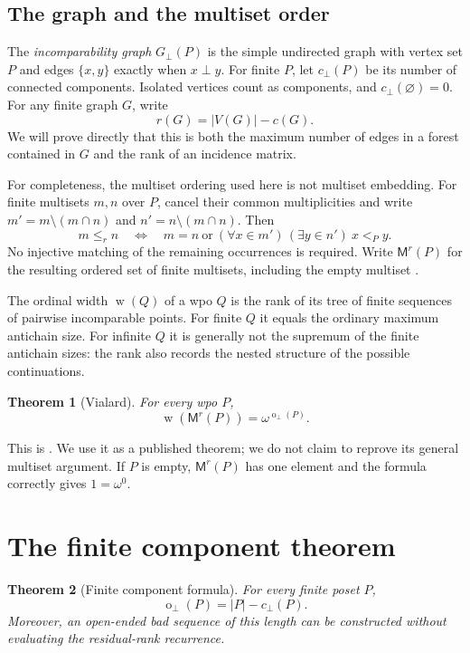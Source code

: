 \documentclass[11pt,a4paper]{article}
\newtheorem{theorem}{Theorem}[section]
\theoremstyle{definition}
\theoremstyle{remark}
\newcommand{\fot}{\operatorname{o}_{\perp}}
\newcommand{\wid}{\operatorname{w}}
\newcommand{\incg}{G_{\perp}}
\newcommand{\cc}{c_{\perp}}
\newcommand{\Mr}{\mathsf{M}^{r}}
\begin{document}
\subsection{The graph and the multiset order}

The \emph{incomparability graph} $\incg(P)$ is the simple undirected graph
with vertex set $P$ and edges $\{x,y\}$ exactly when $x\perp y$.
For finite $P$, let $\cc(P)$ be its number of connected components.
Isolated vertices count as components, and $\cc(\varnothing)=0$.
For any finite graph $G$, write
\[
 r(G)=|V(G)|-c(G).
\]
We will prove directly that this is both the maximum number of edges in a
forest contained in $G$ and the rank of an incidence matrix.

For completeness, the multiset ordering used here is not multiset embedding.
For finite multisets $m,n$ over $P$, cancel their common multiplicities and
write $m'=m\setminus(m\cap n)$ and $n'=n\setminus(m\cap n)$. Then
\begin{equation}\label{eq:multiset}
 m\le_r n\quad\Longleftrightarrow\quad
 m=n\ \text{or}\ (\forall x\in m')\,(\exists y\in n')\ x<_P y.
\end{equation}
No injective matching of the remaining occurrences is required. Write
$\Mr(P)$ for the resulting ordered set of finite multisets, including the
empty multiset \cite[Definition~1.6]{vialard2023}.

The ordinal width $\wid(Q)$ of a wpo $Q$ is the rank of its tree of finite
sequences of pairwise incomparable points. For finite $Q$ it equals the
ordinary maximum antichain size. For infinite $Q$ it is generally not the
supremum of the finite antichain sizes: the rank also records the nested
structure of the possible continuations.

\begin{theorem}[Vialard]\label{thm:vialard}
For every wpo $P$,
\[
 \wid(\Mr(P))=\omega^{\fot(P)}.
\]
\end{theorem}

This is \cite[Theorem~3.4]{vialard2023}. We use it as a published theorem;
we do not claim to reprove its general multiset argument. If $P$ is empty,
$\Mr(P)$ has one element and the formula correctly gives $1=\omega^0$.

\section{The finite component theorem}

\begin{theorem}[Finite component formula]\label{thm:finite}
For every finite poset $P$,
\[
 \boxed{\fot(P)=|P|-\cc(P).}
\]
Moreover, an open-ended bad sequence of this length can be constructed
without evaluating the residual-rank recurrence.
\end{theorem}
\end{document}
